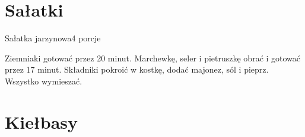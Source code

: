 \documentclass[a4paper,12pt]{article}
\begin{document}
\newpage
\section{Sałatki}

\begin{recipe}{Sałatka jarzynowa}{4 porcje}{}

Ziemniaki gotować przez 20 minut. Marchewkę, seler i pietruszkę obrać i gotować przez 17 minut.
Składniki pokroić w kostkę, dodać majonez, sól i pieprz. Wszystko wymieszać.

\end{recipe}

\newpage

\newpage%
\section{Kiełbasy}
\end{document}
